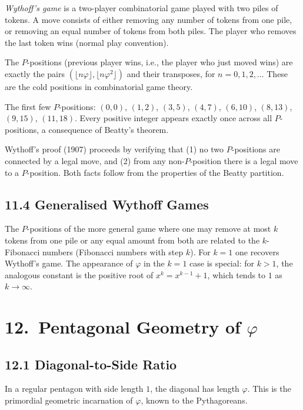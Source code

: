 \emph{Wythoff's game} is a two-player combinatorial game
played with two piles of tokens.
A move consists of either removing any number of tokens
from one pile, or removing an equal number of tokens
from both piles.
The player who removes the last token wins
(normal play convention).

The $P$-positions (previous player wins, i.e., the
player who just moved wins) are exactly the pairs
$(\lfloor n\varphi \rfloor, \lfloor n\varphi^2 \rfloor)$
and their transposes, for $n = 0, 1, 2, \ldots$
These are the cold positions in combinatorial game
theory.

The first few $P$-positions:
$(0,0)$, $(1,2)$, $(3,5)$, $(4,7)$, $(6,10)$,
$(8,13)$, $(9,15)$, $(11,18)$.
Every positive integer appears exactly once across
all $P$-positions, a consequence of Beatty's theorem.

Wythoff's proof (1907) proceeds by verifying that
(1) no two $P$-positions are connected by a legal
move, and (2) from any non-$P$-position there is a
legal move to a $P$-position.
Both facts follow from the properties of the
Beatty partition.

\subsection{11.4 Generalised Wythoff Games}
\label{subsec:gc-wythoff-general}

The $P$-positions of the more general game where one
may remove at most $k$ tokens from one pile or any
equal amount from both are related to the
$k$-Fibonacci numbers (Fibonacci numbers with step $k$).
For $k=1$ one recovers Wythoff's game.
The appearance of $\varphi$ in the $k=1$ case is
special: for $k>1$, the analogous constant is the
positive root of $x^k = x^{k-1} + 1$, which tends to
$1$ as $k\to\infty$.

\section{12.\ Pentagonal Geometry of $\varphi$}
\label{sec:gc-pentagon}

\subsection{12.1 Diagonal-to-Side Ratio}
\label{subsec:gc-pentagon-ratio}

In a regular pentagon with side length $1$, the
diagonal has length $\varphi$.
This is the primordial geometric incarnation of
$\varphi$, known to the Pythagoreans.

